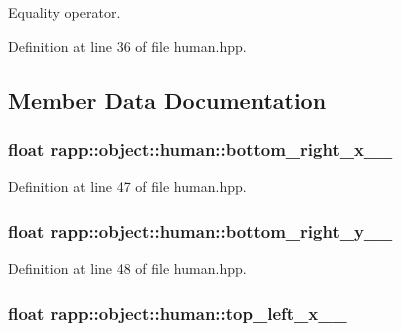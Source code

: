 Equality operator. 



Definition at line 36 of file human.\-hpp.



\subsection{Member Data Documentation}
\hypertarget{classrapp_1_1object_1_1human_aac6439a23bcd02c424eaac014a5aa9c6}{
\subsubsection[{bottom\-\_\-right\-\_\-x\-\_\-\-\_\-}]{\setlength{\rightskip}{0pt plus 5cm}float rapp\-::object\-::human\-::bottom\-\_\-right\-\_\-x\-\_\-\-\_\-\hspace{0.3cm}{\ttfamily [private]}}}\label{classrapp_1_1object_1_1human_aac6439a23bcd02c424eaac014a5aa9c6}


Definition at line 47 of file human.\-hpp.

\hypertarget{classrapp_1_1object_1_1human_ad95373fee7f3850deb1e9fcfa0d4240f}{
\subsubsection[{bottom\-\_\-right\-\_\-y\-\_\-\-\_\-}]{\setlength{\rightskip}{0pt plus 5cm}float rapp\-::object\-::human\-::bottom\-\_\-right\-\_\-y\-\_\-\-\_\-\hspace{0.3cm}{\ttfamily [private]}}}\label{classrapp_1_1object_1_1human_ad95373fee7f3850deb1e9fcfa0d4240f}


Definition at line 48 of file human.\-hpp.

\hypertarget{classrapp_1_1object_1_1human_ac7e51d95c74f211d5aff9f79c2c71e6f}{
\subsubsection[{top\-\_\-left\-\_\-x\-\_\-\-\_\-}]{\setlength{\rightskip}{0pt plus 5cm}float rapp\-::object\-::human\-::top\-\_\-left\-\_\-x\-\_\-\-\_\-\hspace{0.3cm}{\ttfamily [private]}}}\label{classrapp_1_1object_1_1human_ac7e51d95c74f211d5aff9f79c2c71e6f}


